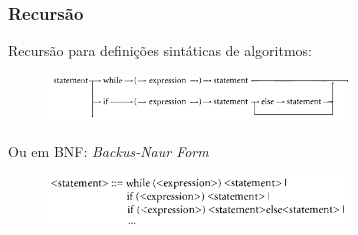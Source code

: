 \documentclass[10pt, handout]{beamer}
\begin{document}
\begin{frame}
  \frametitle{Recursão}
  Recursão para definições sintáticas de algoritmos:
  \vfill
  \begin{figure}[h]
    \begin{center}
      \includegraphics[width=8cm]{fig/img03}
    \end{center}
  \end{figure}
  \vfill
  Ou em BNF: \emph{Backus-Naur Form}
  \vfill
  \begin{figure}[h]
    \begin{center}
      \includegraphics[width=8cm]{fig/img04}
    \end{center}
  \end{figure}

\end{frame}
\end{document}
